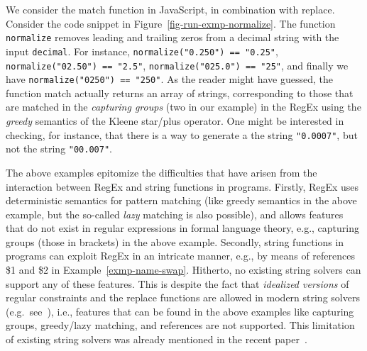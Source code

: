 \begin{example}\label{ex:normalize}
    We consider the match function in JavaScript,
    in combination with replace. %
    Consider the code snippet in Figure~\ref{fig-run-exmp-normalize}.
 The function {\tt normalize}   removes leading and trailing zeros from a decimal string with the input %
{\tt decimal}. For instance,
 \texttt{normalize("0.250") == "0.25"},
 \texttt{normalize("02.50") == "2.5"},
 \texttt{normalize("025.0") == "25"},
and  finally we have \texttt{normalize("0250") == "250"}. As the reader might have
    guessed, the function match actually returns an array of strings,
    corresponding to those that are matched in the \emph{capturing groups} (two
    in our example) in the RegEx using the \emph{greedy} semantics of the Kleene star/plus operator. One might be
    interested in checking, for instance, that there is a way to generate a
    the string \texttt{"0.0007"}, but not the string \texttt{"00.007"}.
\end{example}



The above examples epitomize the difficulties that have arisen from the
interaction between RegEx and string functions in programs. Firstly,
RegEx uses deterministic semantics for pattern matching (like greedy
semantics in the above example, but the so-called \emph{lazy} matching is
also possible), and allows features that do not exist in regular expressions in
formal language theory, e.g., capturing groups (those in brackets) in the above
example. Secondly, string functions in programs can exploit RegEx in an
intricate manner, e.g., by means of references \$1 and \$2 in Example~\ref{exmp-name-swap}. Hitherto, no existing string solvers
can support any of these features. This is despite the fact that \emph{idealized
versions} of regular
constraints and the replace functions are allowed in modern string solvers
(e.g.\ see~\cite{AbdullaACDHRR18-trau,HJLRV18,cvc4,TCJ16,YABI14,CHL+19}), i.e.,
features that can be found in the above examples like capturing groups,
greedy/lazy matching, and references are not supported.
This limitation of existing
string solvers was already mentioned in the recent paper~\cite{LMK19}.


